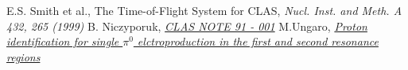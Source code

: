 \begin{thebibliography}{mybib}
         {E.S. Smith et al.}, The Time-of-Flight System for CLAS, {\it Nucl. Inst. and Meth. A 432, 265 (1999)}
                   {B. Niczyporuk},   \href{http://www.jlab.org/Hall-B/notes/clas_notes91/note91-001.pdf}       {\it CLAS NOTE 91 - 001}
     {M.Ungaro},        \href{https://maureeungaro.github.io/home/meson/pi0_resonance/proton_id} {\it Proton identification for single $\pi^0$ elctroproduction in the first and second resonance regions}
\end{thebibliography}
